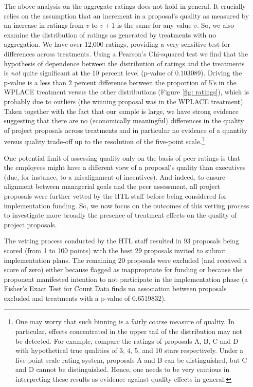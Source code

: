 \documentclass[11pt, titlepage]{article}
\begin{document}
The above analysis on the aggregate ratings does not hold in general. It
crucially relies on the assumption that an increment in a proposal's
quality as measured by an increase in ratings from \(v\) to \(v+1\) is
the same for any value \(v\). So, we also examine the distribution of
ratings as generated by treatments with no aggregation. We have over
12,000 ratings, providing a very sensitive test for differences across
treatments. Using a Pearson's Chi-squared test we find that the
hypothesis of dependence between the distribution of ratings and the
treatments is \emph{not} quite significant at the 10 percent level
(p-value of 0.103089). Driving the p-value is a less than \(2\) percent
difference between the proportion of 5's in the WPLACE treatment versus
the other distributions (Figure \ref{fig: ratings}), which is probably
due to outliers (the winning proposal was in the WPLACE treatment).
Taken together with the fact that our sample is large, we have strong
evidence suggesting that there are no (economically meaningful)
differences in the quality of project proposals across treatments and in
particular no evidence of a quantity versus quality trade-off up to the
resolution of the five-point scale.\footnote{One may worry that such
  binning is a fairly coarse measure of quality. In particular, effects
  concentrated in the upper tail of the distribution may not be
  detected. For example, compare the ratings of proposals A, B, C and D
  with hypothetical true qualities of 3, 4, 5, and 10 stars
  respectively. Under a five-point scale rating system, proposals A and
  B can be distinguished, but C and D cannot be distinguished. Hence,
  one needs to be very cautious in interpreting these results as
  evidence against quality effects in general.}

One potential limit of assessing quality only on the basis of peer
ratings is that the employees might have a different view of a
proposal's quality than executives (due, for instance, to a misalignment
of incentives). And indeed, to ensure alignment between managerial goals
and the peer assessment, all project proposals were further vetted by
the HTL staff before being considered for implementation funding. So, we
now focus on the outcomes of this vetting process to investigate more
broadly the presence of treatment effects on the quality of project
proposals.

The vetting process conducted by the HTL staff resulted in 93 proposals
being scored (from 1 to 100 points) with the best 29 proposals invited
to submit implementation plans. The remaining 20 proposals were excluded
(and received a score of zero) either because flagged as inappropriate
for funding or because the proponent manifested intention to not
participate in the implementation phase (a Fisher's Exact Test for Count
Data finds no association between proposals excluded and treatments with
a p-value of 0.6519832).
\end{document}
